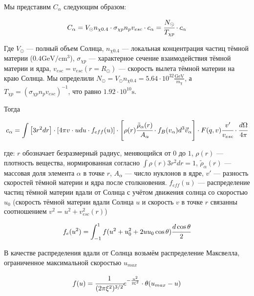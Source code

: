 \documentclass[a4paper, 14pt]{article}
\begin{document}
Мы представим $C_{\alpha}$ следующим образом:

\begin{equation}
	\label{eq:Capture_a}
	C_{\alpha} = V_{\odot} n_{\chi 0.4} \cdot
	\sigma_{\chi p} n_{p} v_{esc} \cdot c_{\alpha} = 
	\cfrac{N_{\odot}}{T_{\chi p}} \cdot c_{\alpha}
\end{equation}

Где $V_{\odot}$ --- полный объем Солнца, $n_{\chi 0.4}$ --- локальная концентрация частиц тёмной материи ($0.4 \text{GeV}/\text{cm}^{3}$), $\sigma_{\chi p}$ --- характерное сечение взаимодействия тёмной материи и ядра, $v_{esc} = v_{esc}(r = R_{\odot})$ --- скорость вылета тёмной материи на краю Солнца. Мы определили $N_{\odot} = V_{\odot} n_{\chi 0.4} = 5.64\cdot10^{32} \frac{\text{GeV}}{m_{\chi}}$, а $T_{\chi p} = (\sigma_{\chi p} n_{p} v_{esc})^{-1}$, что равно $1.92\cdot 10^{10} \text{s}$.

Тогда 

\begin{equation}
	\label{eq:ca_coeff}
	c_{\alpha} = \int  \left[3r^2 dr  \right] \cdot \left[4\pi v \cdot u d u \cdot f_{eff}(u)  \right]  \cdot 
	\left[ \rho(r)\cfrac{\tilde{\rho}_{\alpha}(r)}{A_{\alpha}}  \cdot f_B(v_{\alpha}) d^3 \vec{v}_{\alpha} 
	\right] \cdot F(q,v) \cfrac{v'}{v_{esc}} \cdot \cfrac{d \Omega}{4\pi} 
\end{equation}

где: $r$ обозначает безразмерный радиус, меняющийся от $0$ до $1$, $\rho(r)$ --- плотность вещества, нормированная согласно $\int \rho(r) 3r^2 dr = 1$, $\tilde{\rho}_{\alpha}(r)$ --- массовая доля элемента $\alpha$ в точке $r$, $A_{\alpha}$ --- число нуклонов в ядре, $v'$ --- разность скоростей тёмной материи и ядра после столкновения. $f_{eff}(u)$ --- распределение частиц тёмной материи вдали от Солнца с учётом движения солнца со скоростью $u_0$ (скорость тёмной материи вдали Солнца $u$ и скорость $v$ в точке $r$ связанны соотношением $v^2 = u^2 + v_{esc}^2(r)$)

\begin{equation}
	f_e(u^2) = \int_{-1}^1 {f(u^2+u^2_0 + 2 u u_0 \cos{\theta}) \cfrac{d\cos{\theta}}{2}}
\end{equation}

В качестве распределения вдали от Солнца возьмём распределение Максвелла, ограниченное максимальной скоростью $u_{max}$

\begin{equation}
	f(u)  = \cfrac{1}{(2\pi \xi^2)^{3/2}} e^{-\frac{u^2}{2 \xi^2}} \cdot \theta(u_{max} - u )
\end{equation}
\end{document}
